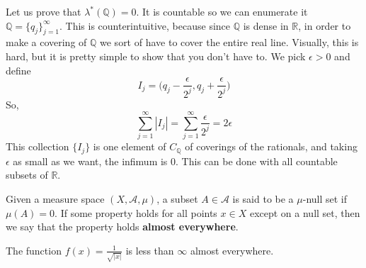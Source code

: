 \documentclass{article}
\begin{document}
\begin{example}
  Let us prove that $\lambda^*(\mathbb{Q}) = 0$. It is countable so we can enumerate it $\mathbb{Q} = \{ q_j\}_{j=1}^\infty$. This is counterintuitive, because since $\mathbb{Q}$ is dense in $\mathbb{R}$, in order to make a covering of $\mathbb{Q}$ we sort of have to cover the entire real line. Visually, this is hard, but it is pretty simple to show that you don't have to. We pick $\epsilon > 0$ and define 
  \[I_j = \big( q_j - \frac{\epsilon}{2^j} , q_j + \frac{\epsilon}{2^j} \big)\]
  So, 
  \[\sum_{j=1}^\infty |I_j| = \sum_{j=1}^\infty \frac{\epsilon}{2^j} = 2 \epsilon\]
  This collection $\{I_j\}$ is one element of $C_\mathbb{Q}$ of coverings of the rationals, and taking $\epsilon$ as small as we want, the infimum is $0$. This can be done with all countable subsets of $\mathbb{R}$. 
\end{example}

\begin{definition}
  Given a measure space $(X, \mathcal{A}, \mu)$, a subset $A \in \mathcal{A}$ is said to be a $\mu$-null set if $\mu(A) = 0$. If some property holds for all points $x \in X$ except on a null set, then we say that the property holds \textbf{almost everywhere}.
\end{definition}

\begin{example}
  The function $f(x) = \frac{1}{\sqrt{|x|}}$ is less than $\infty$ almost everywhere. 
\end{example}
\end{document}
